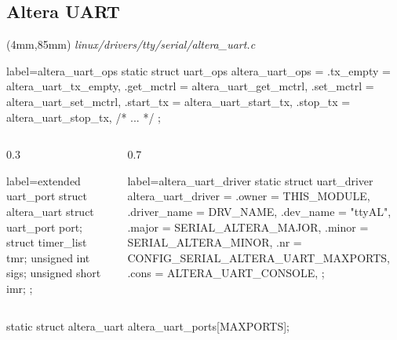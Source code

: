 \documentclass[xcolor=dvipsnames,compress]{beamer}
\newenvironment{reference}[2]{%
  \begin{textblock*}{\textwidth}(#1,#2) 
      \tiny\it\bgroup\color{blue}}{\egroup\end{textblock*}}
\begin{document}
\subsection*{Altera UART}
\begin{frame}[fragile]
\begin{reference}{4mm}{85mm}
linux/drivers/tty/serial/altera\_uart.c
\end{reference} 
    \begin{ccode*}{label=altera\_uart\_ops} 
    static struct uart_ops altera_uart_ops = {
      .tx_empty       = altera_uart_tx_empty,
      .get_mctrl      = altera_uart_get_mctrl,
      .set_mctrl      = altera_uart_set_mctrl,
      .start_tx       = altera_uart_start_tx,
      .stop_tx        = altera_uart_stop_tx,
      /* ... */
    };
    \end{ccode*}
    \begin{columns}[t]
    \begin{column}{0.3\textwidth}
    \begin{ccode*}{label=extended uart\_port} 
    struct altera_uart {
      struct uart_port port;
      struct timer_list tmr;
      unsigned int sigs;
      unsigned short imr;
    }; 
    \end{ccode*}
    \end{column}
    \begin{column}{0.7\textwidth}
    \begin{ccode*}{label=altera\_uart\_driver} 
    static struct uart_driver altera_uart_driver = {
    .owner        = THIS_MODULE,
    .driver_name  = DRV_NAME,
    .dev_name     = "ttyAL",
    .major        = SERIAL_ALTERA_MAJOR,
    .minor        = SERIAL_ALTERA_MINOR,
    .nr           = CONFIG_SERIAL_ALTERA_UART_MAXPORTS,
    .cons         = ALTERA_UART_CONSOLE,
    };
    \end{ccode*}
    \end{column}
    \end{columns}
    \begin{ccode}
    static struct altera_uart altera_uart_ports[MAXPORTS];
    \end{ccode}
\end{frame}
\end{document}
